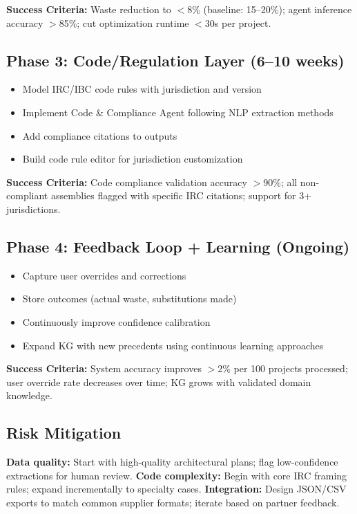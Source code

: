 \textbf{Success Criteria:}
Waste reduction to $<$8\% (baseline: 15--20\%); agent inference accuracy $>$85\%; cut optimization runtime $<$30s per project.

\subsection{Phase 3: Code/Regulation Layer (6--10 weeks)}

\begin{itemize}
  \item Model IRC/IBC code rules with jurisdiction and version~\cite{irc2021}
  \item Implement Code \& Compliance Agent following NLP extraction methods~\cite{zhang2023kg_codes}
  \item Add compliance citations to outputs
  \item Build code rule editor for jurisdiction customization
\end{itemize}

\textbf{Success Criteria:}
Code compliance validation accuracy $>$90\%; all non-compliant assemblies flagged with specific IRC citations; support for 3+ jurisdictions.

\subsection{Phase 4: Feedback Loop + Learning (Ongoing)}

\begin{itemize}
  \item Capture user overrides and corrections
  \item Store outcomes (actual waste, substitutions made)
  \item Continuously improve confidence calibration
  \item Expand KG with new precedents using continuous learning approaches~\cite{zhu2024llm_kg_construction}
\end{itemize}

\textbf{Success Criteria:}
System accuracy improves $>$2\% per 100 projects processed; user override rate decreases over time; KG grows with validated domain knowledge.

\subsection{Risk Mitigation}

\textbf{Data quality:} Start with high-quality architectural plans; flag low-confidence extractions for human review.
\textbf{Code complexity:} Begin with core IRC framing rules; expand incrementally to specialty cases.
\textbf{Integration:} Design JSON/CSV exports to match common supplier formats; iterate based on partner feedback.

